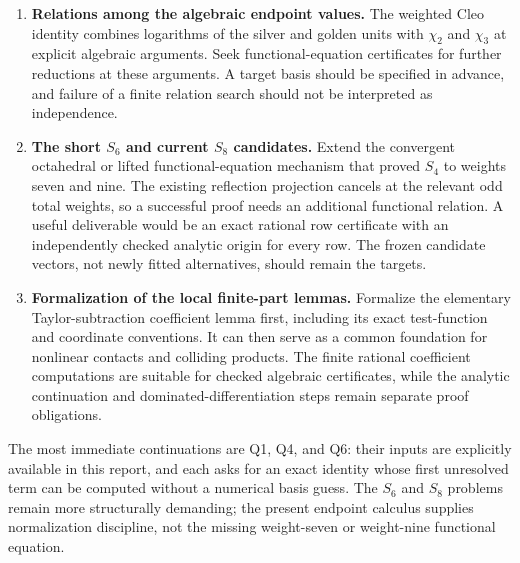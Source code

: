 \begin{enumerate}[label=\textbf{Q\arabic*.},leftmargin=*]
\item \textbf{Relations among the algebraic endpoint values.}
The weighted Cleo identity combines logarithms of the silver and golden
units with $\chi_2$ and $\chi_3$ at explicit algebraic arguments. Seek
functional-equation certificates for further reductions at these
arguments. A target basis should be specified in advance, and failure
of a finite relation search should not be interpreted as independence.

\item \textbf{The short $S_6$ and current $S_8$ candidates.}
Extend the convergent octahedral or lifted functional-equation mechanism
that proved $S_4$ to weights seven and nine. The existing reflection
projection cancels at the relevant odd total weights, so a successful
proof needs an additional functional relation. A useful deliverable
would be an exact rational row certificate with an independently
checked analytic origin for every row. The frozen candidate vectors,
not newly fitted alternatives, should remain the targets.

\item \textbf{Formalization of the local finite-part lemmas.}
Formalize the elementary Taylor-subtraction coefficient lemma first,
including its exact test-function and coordinate conventions. It can
then serve as a common foundation for nonlinear contacts and colliding
products. The finite rational coefficient computations are suitable
for checked algebraic certificates, while the analytic continuation
and dominated-differentiation steps remain separate proof obligations.
\end{enumerate}

The most immediate continuations are Q1, Q4, and Q6: their inputs are
explicitly available in this report, and each asks for an exact identity
whose first unresolved term can be computed without a numerical basis
guess. The $S_6$ and $S_8$ problems remain more structurally demanding;
the present endpoint calculus supplies normalization discipline, not
the missing weight-seven or weight-nine functional equation.
